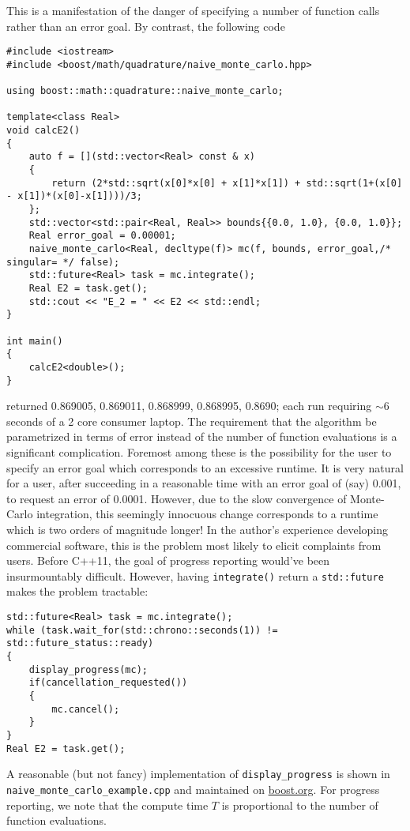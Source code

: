 \documentclass{ansarticle}
\begin{document}
This is a manifestation of the danger of specifying a number of function calls rather than an error goal.
By contrast, the following code
\begin{verbatim}
#include <iostream>
#include <boost/math/quadrature/naive_monte_carlo.hpp>

using boost::math::quadrature::naive_monte_carlo;

template<class Real>
void calcE2()
{
    auto f = [](std::vector<Real> const & x)
    {
        return (2*std::sqrt(x[0]*x[0] + x[1]*x[1]) + std::sqrt(1+(x[0] - x[1])*(x[0]-x[1])))/3;
    };
    std::vector<std::pair<Real, Real>> bounds{{0.0, 1.0}, {0.0, 1.0}};
    Real error_goal = 0.00001;
    naive_monte_carlo<Real, decltype(f)> mc(f, bounds, error_goal,/* singular= */ false);
    std::future<Real> task = mc.integrate();
    Real E2 = task.get();
    std::cout << "E_2 = " << E2 << std::endl;
}

int main()
{
    calcE2<double>();
}
\end{verbatim}
returned 0.869005, 0.869011, 0.868999, 0.868995, 0.8690; each run requiring ${\sim}6$ seconds of a 2 core consumer laptop.
The requirement that the algorithm be parametrized in terms of error instead of the number of function evaluations is a significant complication.
Foremost among these is the possibility for the user to specify an error goal which corresponds to an excessive runtime.
It is very natural for a user, after succeeding in a reasonable time with an error goal of (say) 0.001, to request an error of 0.0001.
However, due to the slow convergence of Monte-Carlo integration, this seemingly innocuous change corresponds to a runtime which is two orders of magnitude longer!
In the author's experience developing commercial software, this is the problem most likely to elicit complaints from users.
Before C++11, the goal of progress reporting would've been insurmountably difficult.
However, having \texttt{integrate()} return a \texttt{std::future} makes the problem tractable:
\begin{verbatim}
std::future<Real> task = mc.integrate();
while (task.wait_for(std::chrono::seconds(1)) != std::future_status::ready)
{
    display_progress(mc);
    if(cancellation_requested())
    {
        mc.cancel();
    }
}
Real E2 = task.get();
\end{verbatim}
A reasonable (but not fancy) implementation of \texttt{display_progress} is shown in \texttt{naive_monte_carlo_example.cpp} and maintained on \href{http://www.boost.org}{boost.org}.
For progress reporting, we note that the compute time $T$ is proportional to the number of function evaluations.
\end{document}
